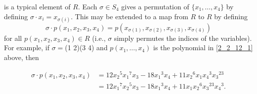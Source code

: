 \begin{enumerate}
                  is a typical element of $R$. Each $\sigma \in S_4$ gives a
                  permutation of $\{x_1, \ldots, x_4\}$ by defining
                  $\sigma \cdot x_i = x_{\sigma(i)}$. This may be extended to a
                  map from $R$ to $R$ by defining
                  $$\sigma \cdot p(x_1, x_2, x_3, x_4) = p(x_{\sigma(1)},
                    x_{\sigma(2)}, x_{\sigma(3)}, x_{\sigma(4)})$$
                  for all $p(x_1, x_2, x_3, x_4) \in R$ (i.e., $\sigma$ simply
                  permutes the indices of the variables). For example, if
                  $\sigma =$(1 2)(3 4) and $p(x_1, \ldots, x_4)$ is the
                  polynomial in \eqref{2_2_12_1} above, then

                  \begin{align*}
                     \sigma \cdot p(x_1, x_2, x_3, x_4) &= 12{x_2}^5{x_1}^7x_3 -
                        18{x_1}^3x_4 + 11{x_2}^6x_1{x_4}^3{x_3}^{23} \\
                        &= 12{x_1}^7{x_2}^5x_3 -
                        18{x_1}^3x_4 + 11x_1{x_2}^6{x_3}^{23}{x_4}^3.
                  \end{align*}


\end{enumerate}
